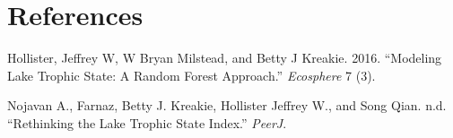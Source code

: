 \documentclass[fleqn,10pt,lineno]{wlpeerj} %
\begin{document}
\hypertarget{references}{%
\section*{References}\label{references}}



\hypertarget{refs}{}
\leavevmode\hypertarget{ref-hollister2016modeling}{}%
Hollister, Jeffrey W, W Bryan Milstead, and Betty J Kreakie. 2016. ``Modeling Lake Trophic State: A Random Forest Approach.'' \emph{Ecosphere} 7 (3).

\leavevmode\hypertarget{ref-nojavantsi}{}%
Nojavan A., Farnaz, Betty J. Kreakie, Hollister Jeffrey W., and Song Qian. n.d. ``Rethinking the Lake Trophic State Index.'' \emph{PeerJ}.
\end{document}
